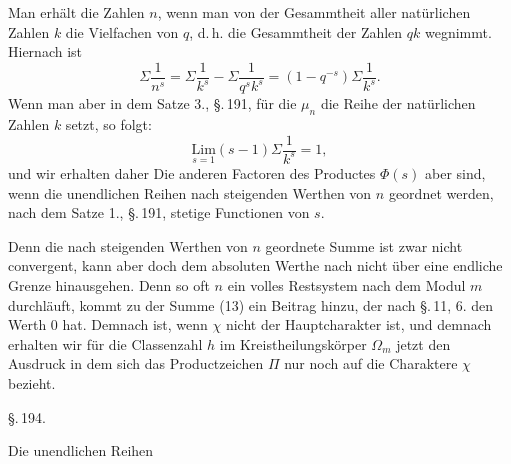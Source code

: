 Man erhält die Zahlen $n$, wenn man von der Gesammtheit aller natürlichen
Zahlen $k$ die Vielfachen von $q$, d.\,h. die Gesammtheit der Zahlen $qk$
wegnimmt. Hiernach ist
\[
\Sigma \frac{1}{n^s} = \Sigma \frac{1}{k^s} - \Sigma \frac{1}{q^s k^s} = (1-q^{-s}) \Sigma \frac{1}{k^s}.
\]
Wenn man aber in dem Satze 3., \S.\,191, für die $\mu_n$ die Reihe der
natürlichen Zahlen $k$ setzt, so folgt:
\[
\underset{s=1}{\mathrm{Lim}} (s-1) \Sigma \frac{1}{k^s} = 1,
\]
und wir erhalten daher
Die anderen Factoren des Productes $\Phi(s)$ aber sind, wenn die
unendlichen Reihen nach steigenden Werthen von $n$ geordnet werden, nach
dem Satze 1., \S.\,191, stetige Functionen von $s$.

Denn die nach steigenden Werthen von $n$ geordnete Summe
ist zwar nicht convergent, kann aber doch dem absoluten Werthe nach nicht
über eine endliche Grenze hinausgehen. Denn so oft $n$ ein volles
Restsystem nach dem Modul $m$ durchläuft, kommt zu der Summe (13) ein
Beitrag hinzu, der nach \S.\,11, 6. den Werth 0 hat. Demnach ist, wenn $\chi$
nicht der Hauptcharakter ist,
und demnach erhalten wir für die Classenzahl $h$ im Kreistheilungskörper
$\Omega_m$ jetzt den Ausdruck
in dem sich das Productzeichen $\Pi$ nur noch auf die  Charaktere $\chi$ bezieht.

\begin{center}
\S.\,194.

\end{center}

Die unendlichen Reihen

